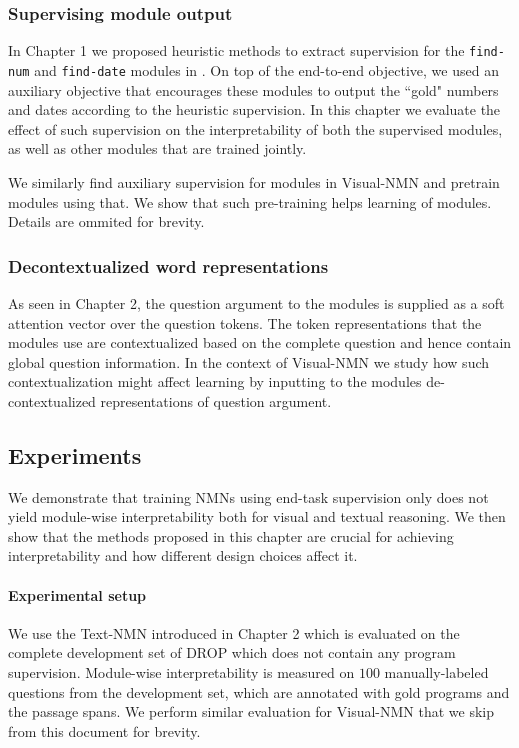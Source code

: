 \documentclass[main.tex]{subfiles}
\begin{document}
\subsubsection{Supervising module output}
In Chapter 1 we proposed heuristic methods to extract supervision for the \texttt{find-num} and \texttt{find-date} modules in \drop{}. On top of the end-to-end objective, we used an auxiliary objective that encourages these modules to output the ``gold" numbers and dates according to the heuristic supervision.
In this chapter we evaluate the effect of such supervision on the interpretability of both the supervised modules, as well as other modules that are trained jointly.

We similarly find auxiliary supervision for modules in Visual-NMN and pretrain modules using that. We show that such pre-training helps learning of modules. Details are ommited for brevity.

\subsubsection{Decontextualized word representations}
As seen in Chapter 2, the question argument to the modules is supplied as a soft attention vector over the question tokens. The token representations that the modules use are contextualized based on the complete question and hence contain global question information. In the context of Visual-NMN we study how such contextualization might affect learning by inputting to the modules de-contextualized representations of question argument.


\subsection{Experiments}
We demonstrate that training NMNs using end-task supervision only does not yield module-wise interpretability both for visual and textual reasoning. We then show that the methods proposed in this chapter are crucial for achieving interpretability and how different design choices affect it.

\paragraph{Experimental setup}
We use the Text-NMN introduced in Chapter 2 which is evaluated on the complete development set of DROP which does not contain any program supervision.  Module-wise interpretability is measured on $100$ manually-labeled questions from the development set, which are annotated with gold programs and the passage spans.
We perform similar evaluation for Visual-NMN that we skip from this document for brevity.
\end{document}
